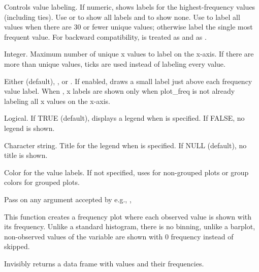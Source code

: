 \documentclass[a4paper]{book}
\begin{document}
\begin{Arguments}
\begin{ldescription}
\item[\code{value.labels}] Controls value labeling. If numeric, shows labels for the 
highest-frequency values (including ties). Use  or  to show all labels and
 to show none. Use  to label all values when there are 30 or fewer
unique values; otherwise label the single most frequent value. For backward compatibility, 
is treated as  and  as .

\item[\code{ticks.max}] Integer. Maximum number of unique x values to label on the x-axis. If there are more
than  unique values,  ticks are used instead of labeling every value.

\item[\code{show.x.value}] Either  (default), , or . If enabled, draws a
small  label just above each frequency value label. When , x labels are
shown only when plot\_freq is not already labeling all x values on the x-axis.

\item[\code{show.legend}] Logical. If TRUE (default), displays a legend when  is specified. If FALSE, no legend is shown.

\item[\code{legend.title}] Character string. Title for the legend when  is specified. If NULL (default), no title is shown.

\item[\code{col.text}] Color for the value labels. If not specified, uses  for non-grouped plots or group colors for grouped plots.

\item[\code{...}] Pass on any argument accepted by  e.g.,  , 
\end{ldescription}
\end{Arguments}
%
\begin{Details}
This function creates a frequency plot where each observed value is shown
with its frequency. Unlike a standard histogram, there is no binning, unlike
a barplot, non-observed values of the variable are shown with 0 frequency 
instead of skipped.
\end{Details}
%
\begin{Value}
Invisibly returns a data frame with values and their frequencies.
\end{Value}
\end{document}
